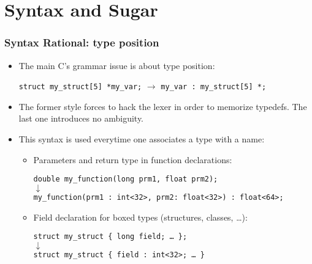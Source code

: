 \documentclass[pdftex]{beamer}
\begin{document}
\section{Syntax and Sugar}

\begin{frame}[fragile]
  \frametitle{Syntax Rational: type position}
  \begin{itemize}
  \item The main C's grammar issue is about type position:
    \begin{center}\scriptsize
      \verb#struct my_struct[5] *my_var;#
      \hspace{0.3cm}$\rightarrow$\hspace{0.3cm}
      \verb#my_var : my_struct[5] *;#
    \end{center}
  \item The former style forces to hack the lexer in order to memorize typedefs. The
    last one introduces no ambiguity.
  \item This syntax is used everytime one associates a type with a name:
    \begin{itemize}
      \item Parameters and return type in function declarations:
        \begin{center}\scriptsize
          \verb#double my_function(long prm1, float prm2);# \\
          \hspace{0.3cm}$\downarrow$\hspace{0.3cm} \\
          \verb#my_function(prm1 : int<32>, prm2: float<32>) : float<64>;# \\
        \end{center}
      \item Field declaration for boxed types (structures, classes, \ldots):
        \begin{center}\scriptsize
          \verb#struct my_struct { long field; … };# \\
          \hspace{0.3cm}$\downarrow$\hspace{0.3cm} \\
          \verb#struct my_struct { field : int<32>; … }# \\
        \end{center}
    \end{itemize}
  \end{itemize}
\end{frame}
\end{document}
